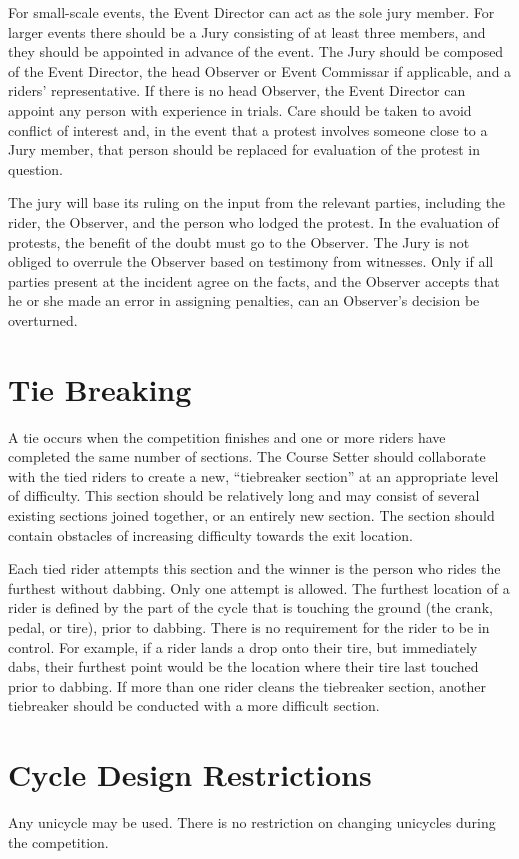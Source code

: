 For small-scale events, the Event Director can act as the sole jury member. 
For larger events there should be a Jury consisting of at least three members, and they should be appointed in advance of the event. 
The Jury should be composed of the Event Director, the head Observer or Event Commissar if applicable, and a riders' representative. 
If there is no head Observer, the Event Director can appoint any person with experience in trials. 
Care should be taken to avoid conflict of interest and, in the event that a protest involves someone close to a Jury member, that person should be replaced for evaluation of the protest in question.

The jury will base its ruling on the input from the relevant parties, including the rider, the Observer, and the person who lodged the protest.
In the evaluation of protests, the benefit of the doubt must go to the Observer. 
The Jury is not obliged to overrule the Observer based on testimony from witnesses. 
Only if all parties present at the incident agree on the facts, and the Observer accepts that he or she made an error in assigning penalties, can an Observer's decision be overturned.

\section{Tie Breaking}
A tie occurs when the competition finishes and one or more riders have completed the same number of sections.
The Course Setter should collaborate with the tied riders to create a new, ``tiebreaker section'' at an appropriate level of difficulty. 
This section should be relatively long and may consist of several existing sections joined together, or an entirely new section.
The section should contain obstacles of increasing difficulty towards the exit location.

Each tied rider attempts this section and the winner is the person who rides the furthest without dabbing.
Only one attempt is allowed. 
The furthest location of a rider is defined by the part of the cycle that is touching the ground (the crank, pedal, or tire), prior to dabbing. 
There is no requirement for the rider to be in control. 
For example, if a rider lands a drop onto their tire, but immediately dabs, their furthest point would be the location where their tire last touched prior to dabbing.
If more than one rider cleans the tiebreaker section, another tiebreaker should be conducted with a more difficult section.

\section{Cycle Design Restrictions}
Any unicycle may be used. 
There is no restriction on changing unicycles during the competition.

